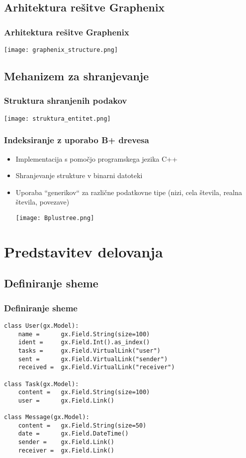 \documentclass{beamer}
\begin{document}
    \subsection{Arhitektura rešitve Graphenix}
    \begin{frame}
    \frametitle{Arhitektura rešitve Graphenix}
        \centering
        \texttt{[image: graphenix\_structure.png]}
    \end{frame}

    \subsection{Mehanizem za shranjevanje}
    \begin{frame}
    \frametitle{Struktura shranjenih podakov}
        \centering
        \texttt{[image: struktura\_entitet.png]}
    \end{frame}

    \begin{frame}
    \frametitle{Indeksiranje z uporabo B+ drevesa}
    \begin{itemize}
        \item Implementacija s pomočjo programskega jezika C++
        \item Shranjevanje strukture v binarni datoteki
        \item Uporaba ``generikov`` za različne podatkovne tipe (nizi, cela števila, realna števila, povezave)
        
        \centering
        \texttt{[image: Bplustree.png]}
    \end{itemize}
    \end{frame}

\section{Predstavitev delovanja}
    \subsection{Definiranje sheme}
    \begin{frame}[fragile]
    \frametitle{Definiranje sheme}
    \footnotesize
        \begin{verbatim}
class User(gx.Model):
    name =      gx.Field.String(size=100)
    ident =     gx.Field.Int().as_index()
    tasks =     gx.Field.VirtualLink("user")
    sent =      gx.Field.VirtualLink("sender")
    received =  gx.Field.VirtualLink("receiver")
    
class Task(gx.Model):
    content =   gx.Field.String(size=100)
    user =      gx.Field.Link()
    
class Message(gx.Model):
    content =   gx.Field.String(size=50)
    date =      gx.Field.DateTime()
    sender =    gx.Field.Link()
    receiver =  gx.Field.Link()
        \end{verbatim}
    \end{frame}
\end{document}
